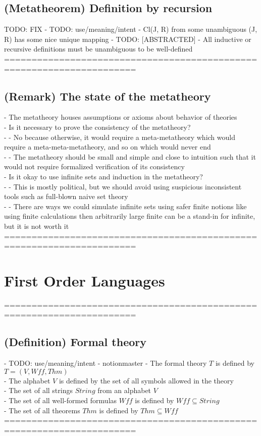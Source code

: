 \documentclass{article}
\begin{document}
\subsection{(Metatheorem) Definition by recursion} TODO: FIX
	- TODO: use/meaning/intent - Cl(J, R) from some unambiguous (J, R) has some nice unique mapping
	- TODO: [ABSTRACTED]
	- All inductive or recursive definitions must be unambiguous to be well-defined
	======================================================================
\subsection{(Remark) The state of the metatheory}
	- The metatheory houses assumptions or axioms about behavior of theories \\
	- Is it necessary to prove the consistency of the metatheory? \\
		- - No because otherwise, it would require a meta-metatheory which would require a meta-meta-metatheory, and so on which would never end \\
		- - The metatheory should be small and simple and close to intuition such that it would not require formalized verification of its consistency \\
	- Is it okay to use infinite sets and induction in the metatheory? \\
		- - This is mostly political, but we should avoid using suspicious inconsistent tools such as full-blown naive set theory \\
		- - There are ways we could simulate infinite sets using safer finite notions like using finite calculations then arbitrarily large finite can be a stand-in for infinite, but it is not worth it \\
	======================================================================

\section{First Order Languages}
	======================================================================
\subsection{(Definition) Formal theory}
	- TODO: use/meaning/intent - notionmaster
	- The formal theory $T$ is defined by $T = (V, Wff, Thm)$ \\ %
	- The alphabet $V$ is defined by the set of all symbols allowed in the theory \\
	- The set of all strings $String$ from an alphabet $V$ \\
	- The set of all well-formed formulas $Wff$ is defined by $Wff \subseteq String$ \\
	- The set of all theorems $Thm$ is defined by $Thm \subseteq Wff$ \\
	======================================================================
\end{document}
